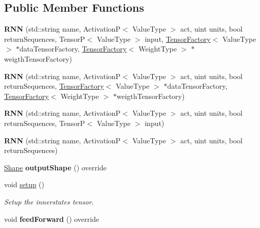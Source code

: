 \subsection*{Public Member Functions}
\begin{DoxyCompactItemize}
\item 
\mbox{\label{classRNN_aa982bcc0e03a1f4585a01dd651649f5d}} 
{\bfseries R\+NN} (std\+::string name, ActivationP$<$ Value\+Type $>$ act, uint units, bool return\+Sequences, TensorP$<$ Value\+Type $>$ input, \hyperlink{classTensorFactory}{Tensor\+Factory}$<$ Value\+Type $>$ $\ast$data\+Tensor\+Factory, \hyperlink{classTensorFactory}{Tensor\+Factory}$<$ Weight\+Type $>$ $\ast$weigth\+Tensor\+Factory)
\item 
\mbox{\label{classRNN_a2baf8d9ce31102e38b5f5d139025c557}} 
{\bfseries R\+NN} (std\+::string name, ActivationP$<$ Value\+Type $>$ act, uint units, bool return\+Sequences, \hyperlink{classTensorFactory}{Tensor\+Factory}$<$ Value\+Type $>$ $\ast$data\+Tensor\+Factory, \hyperlink{classTensorFactory}{Tensor\+Factory}$<$ Weight\+Type $>$ $\ast$weigth\+Tensor\+Factory)
\item 
\mbox{\label{classRNN_a1f6d7f43c4155d0bbaf063cb031edeab}} 
{\bfseries R\+NN} (std\+::string name, ActivationP$<$ Value\+Type $>$ act, uint units, bool return\+Sequences, TensorP$<$ Value\+Type $>$ input)
\item 
\mbox{\label{classRNN_a3488c2dcc7243fedf7083bec0a27c617}} 
{\bfseries R\+NN} (std\+::string name, ActivationP$<$ Value\+Type $>$ act, uint units, bool return\+Sequences)
\item 
\mbox{\label{classRNN_a5f113c19ffdc04b65eed9bb0b592a58f}} 
\hyperlink{classShape}{Shape} {\bfseries output\+Shape} () override
\item 
void \hyperlink{classRNN_a890f6b8ea11485596a26f7fc5f42bfea}{setup} ()
\begin{DoxyCompactList}\small\item\em Setup the innerstates tensor. \end{DoxyCompactList}\item 
\mbox{\label{classRNN_aa9b9694c91c83497b537b170526e8927}} 
void {\bfseries feed\+Forward} () override
\item 

\end{DoxyCompactItemize}
